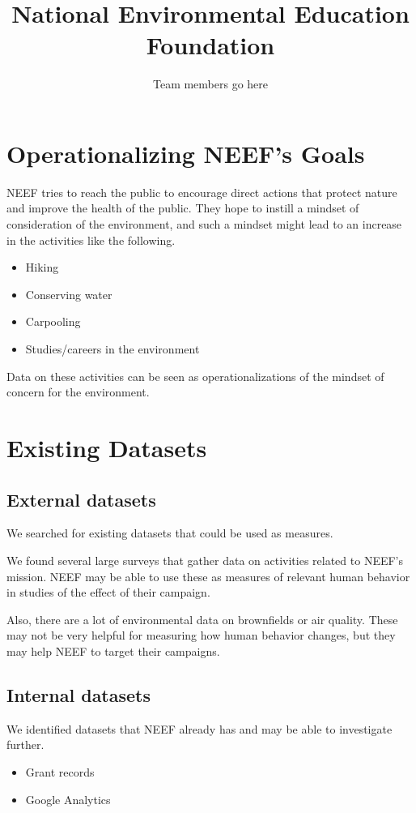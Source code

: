 \documentclass{article}
\title{National Environmental Education Foundation}
\author{Team members go here}
\begin{document}
\maketitle
{}

\section{Operationalizing NEEF's Goals}
NEEF tries to reach the public to encourage direct actions that protect nature and improve the health of the public.
They hope to instill a mindset of consideration of the environment, and such a mindset might lead to an increase
in the activities like the following.
\begin{itemize}
\item Hiking
\item Conserving water
\item Carpooling
\item Studies/careers in the environment
\end{itemize}

Data on these activities can be seen as operationalizations of the mindset of concern for the environment.

\section{Existing Datasets}

\subsection{External datasets}
We searched for existing datasets that could be used as measures.

We found several large surveys that
gather data on activities related to NEEF's mission.
NEEF may be able to use these as measures of
relevant human behavior in studies of the effect of their campaign.

Also, there are a lot of environmental data on brownfields or air quality.
These may not be very helpful for measuring how human behavior changes,
but they may help NEEF to target their campaigns.

\subsection{Internal datasets}
We identified datasets that NEEF already has and may be able to investigate further.
\begin{itemize}
\item Grant records
\item Google Analytics
\end{itemize}
\end{document}
